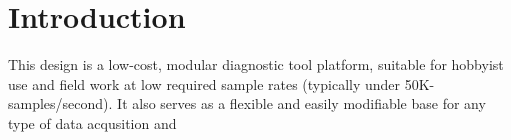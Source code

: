 \section[Introduction]{Introduction}
This design is a low-cost, modular diagnostic tool platform, suitable for 
hobbyist use and field work at low required sample rates (typically under 
50K-samples/second). It also serves as a flexible and easily modifiable base for any type of data acqusition and 
